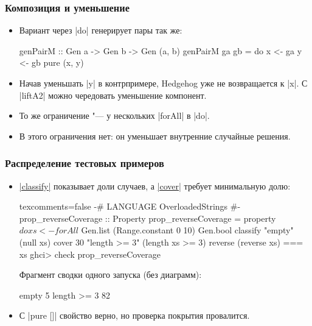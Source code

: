 \documentclass[11pt]{beamer}
\begin{document}
\begin{frame}[fragile]
  \frametitle{Композиция и уменьшение}
  \begin{itemize}
    \item Вариант через \haskinline|do| генерирует пары так же:
          \begin{haskellsmall}
            genPairM :: Gen a -> Gen b -> Gen (a, b)
            genPairM ga gb = do
              x <- ga
              y <- gb
              pure (x, y)
          \end{haskellsmall}
          \pause
    \item Начав уменьшать \haskinline|y| в контрпримере, Hedgehog уже не возвращается к \haskinline|x|. С \haskinline|liftA2| можно чередовать уменьшение компонент.
    \item То же ограничение "--- у нескольких \haskinline|forAll| в \haskinline|do|.
    \item В  этого ограничения нет: он уменьшает внутренние случайные решения.
  \end{itemize}
\end{frame}

\begin{frame}[fragile]
  \frametitle{Распределение тестовых примеров}
  \begin{itemize}
    \item \href{https://hackage.haskell.org/package/hedgehog/docs/Hedgehog.html#v:classify}{\haskinline|classify|} показывает доли случаев, а \href{https://hackage.haskell.org/package/hedgehog/docs/Hedgehog.html#v:cover}{\haskinline|cover|} требует минимальную долю:
          \begin{haskellsmall*}{texcomments=false}
            {-# LANGUAGE OverloadedStrings #-}
            prop_reverseCoverage :: Property
            prop_reverseCoverage = property $ do
              xs <- forAll $ Gen.list
                (Range.constant 0 10) Gen.bool
              classify "empty" (null xs)
              cover 30 "length >= 3" (length xs >= 3)
              reverse (reverse xs) === xs
            ghci> check prop_reverseCoverage
          \end{haskellsmall*}
          \pause
          {\footnotesize Фрагмент сводки одного запуска (без диаграмм):}
          \begin{ghcismall}
            empty        5%
            length >= 3 82%
          \end{ghcismall}
    \item С \haskinline|pure []| свойство верно, но проверка покрытия провалится.
  \end{itemize}
\end{frame}
\end{document}
